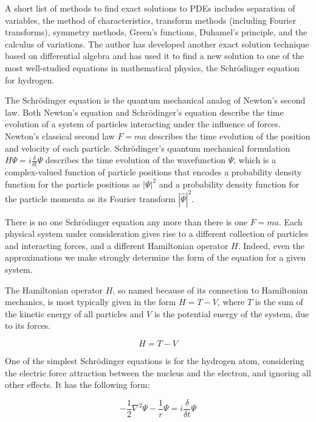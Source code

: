 \documentclass{article}
\begin{document}
A short list of methods to find exact solutions to PDEs includes separation of variables,
the method of characteristics, transform methods (including Fourier transforms),
symmetry methods, Green's functions, Duhamel's principle, and the calculus of variations.
The author has developed another exact solution technique based on differential algebra
and has used it to find a new solution to one of the most well-studied equations
in mathematical physics, the Schr\"odinger equation for hydrogen.

The Schr\"odinger equation is the quantum mechanical analog of Newton's second law.
Both Newton's equation and Schr\"odinger's equation
describe the time evolution of a system
of particles interacting under the influence of forces.
Newton's classical second law $F=ma$
describes the time evolution of the position and velocity of each particle.
Schr\"odinger's quantum mechanical formulation $H\Psi=i\frac{\delta}{\delta t} \Psi$
describes the time evolution
of the wavefunction $\Psi$, which is a complex-valued function of particle positions
that encodes a probability density function for
the particle positions as $|\Psi|^2$ and a probability density function
for the particle momenta as its Fourier transform $|\hat{\Psi}|^2$.

There is no one Schr\"odinger equation any more than there is one $F=ma$.
Each physical system under consideration gives rise to a different collection
of particles and interacting forces, and a different Hamiltonian operator $H$.
Indeed, even the approximations we
make strongly determine the form of the equation for a given system.

The Hamiltonian operator $H$, so named because of its connection to Hamiltonian
mechanics, is most typically given in the form $H=T-V$, where $T$ is the
sum of the kinetic energy of all particles and $V$ is the potential energy
of the system, due to its forces.

\begin{equation*}
H=T-V
\end{equation*}

One of the simplest Schr\"odinger equations is for the hydrogen atom,
considering the electric force attraction between the nucleus and
the electron, and ignoring all other effects.  It has the following form:

\begin{equation*}
-\frac{1}{2}\nabla^2 \Psi - \frac{1}{r}\Psi = i \frac{\delta}{\delta t} \Psi
\end{equation*}
\end{document}
